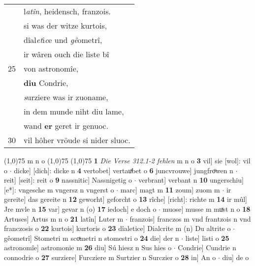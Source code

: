 \documentclass[8pt,a4paper,notitlepage]{article}
\begin{document}
\begin{table}[ht]
\begin{minipage}[t]{0.5\linewidth}
\begin{tabular}{rl}
 & l\textit{atîn}, heidensch, franzois.\\ 
 & si was der witze kurtois,\\ 
 & dîal\textit{et}i\textit{c}e und \textit{gê}ometrî,\\ 
 & ir wâren ouch die liste bî\\ 
25 & von astronomîe,\\ 
 & \textbf{diu} Condrie,\\ 
 & \textit{s}urziere was ir zuoname,\\ 
 & in dem munde niht diu lame,\\ 
 & wand \textbf{er} geret ir genuoc.\\ 
30 & vil hôher vröude si nider sluoc.\\ 
\end{tabular}
\scriptsize
\line(1,0){75} \newline
m n o \newline
\line(1,0){75} \newline
\newline
\line(1,0){75} \newline
\textbf{1} \textit{Die Verse 312.1-2 fehlen} m n o  \textbf{3} vil] sie [wol]: vil o  $\cdot$ dicke] [dich]: dicke n \textbf{4} vertobet] vertauͯbet o \textbf{6} juncvrouwe] jungfroͧwen n  $\cdot$ reit] [seit]: reit o \textbf{9} nassnitic] Nassnigetig o  $\cdot$ verbrant] verbant n \textbf{10} ungerschiu] [e*]: vngesche m vngersz n vngerst o  $\cdot$ marc] magt m \textbf{11} zoum] zuom m  $\cdot$ ir gereite] das gereite n \textbf{12} geworht] geforcht o \textbf{13} rîche] [richt]: richte m \textbf{14} ir mûl] Jre mvle n \textbf{15} var] gevar n (o) \textbf{17} iedoch] e doch o  $\cdot$ muose] musse m muͯst n o \textbf{18} Artuses] Artus m n o \textbf{21} latîn] Luter m  $\cdot$ franzois] franczos m vnd frantzois n vnd franczosis o \textbf{22} kurtois] kurtoris o \textbf{23} dîaletice] Dialcrite m (n) Du altrite o  $\cdot$ gêometrî] Stometri m scoͯmetri n stomestri o \textbf{24} die] der n  $\cdot$ liste] listi o \textbf{25} astronomîe] astromonie m \textbf{26} diu] Sú hiesz n Sus hies o  $\cdot$ Condrie] Cundrie n connodrie o \textbf{27} surziere] Furcziere m Surtzier n Surczier o \textbf{28} in] An o  $\cdot$ diu] de o \newline
\end{minipage}
\end{table}
\newpage
\end{document}
